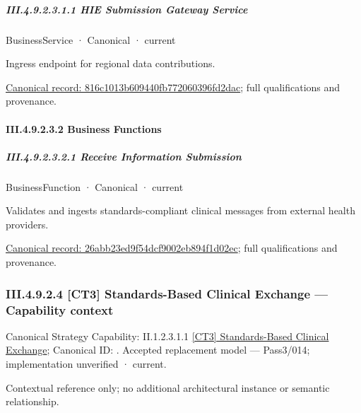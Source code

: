 \subparagraph*{III.4.9.2.3.1.1 HIE Submission Gateway Service}
\label{navigation:III.4.9.2.3.1.1}

\label{element:816c1013b609440fb772060396fd2dac}
{\small BusinessService · Canonical · current}\par

Ingress endpoint for regional data contributions.


{\footnotesize \href{../../../../continuum/business/business-service/816c1013b609440fb772060396fd2dac.md}{Canonical record: 816c1013b609440fb772060396fd2dac}; full qualifications and provenance.}\par
\paragraph*{III.4.9.2.3.2 Business Functions}
\label{navigation:III.4.9.2.3.2}

\subparagraph*{III.4.9.2.3.2.1 Receive Information Submission}
\label{navigation:III.4.9.2.3.2.1}

\label{element:26abb23ed9f54dcf9002eb894f1d02ec}
{\small BusinessFunction · Canonical · current}\par

Validates and ingests standards-compliant clinical messages from external health providers.


{\footnotesize \href{../../../../continuum/business/business-function/26abb23ed9f54dcf9002eb894f1d02ec.md}{Canonical record: 26abb23ed9f54dcf9002eb894f1d02ec}; full qualifications and provenance.}\par
\subsubsection*{III.4.9.2.4 [CT3] Standards-Based Clinical Exchange — Capability context}
\label{navigation:III.4.9.2.4}

{\small Canonical Strategy Capability: II.1.2.3.1.1 \hyperref[element:319398b3f4b54bac85b61cb5ecd392b1]{[CT3] Standards-Based Clinical Exchange}; Canonical ID: \texttt{}. Accepted replacement model — Pass3/014; implementation unverified · current.}\par
Contextual reference only; no additional architectural instance or semantic relationship.\par
